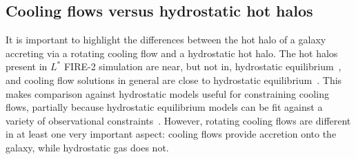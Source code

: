 \documentclass[fleqn,usenatbib]{mnras}
\begin{document}





\subsection{Cooling flows versus hydrostatic hot halos}
\label{s: modes -- hydrostatic}

It is important to highlight the differences between the hot halo of a galaxy accreting via a rotating cooling flow and a hydrostatic hot halo.
The hot halos present in $L^*$ FIRE-2 simulation are near, but not in, hydrostatic equilibrium~\citep{Esmerian2020, Stern2020}, and cooling flow solutions in general are close to hydrostatic equilibrium~\citep{Stern2019}.
This makes comparison against hydrostatic models useful for constraining cooling flows, partially because hydrostatic equilibrium models can be fit against a variety of observational constraints~\citep[e.g.][]{Faerman2017, Faerman2019, Krause2019}.
However, rotating cooling flows are different in at least one very important aspect: cooling flows provide accretion onto the galaxy, while hydrostatic gas does not.
\end{document}
